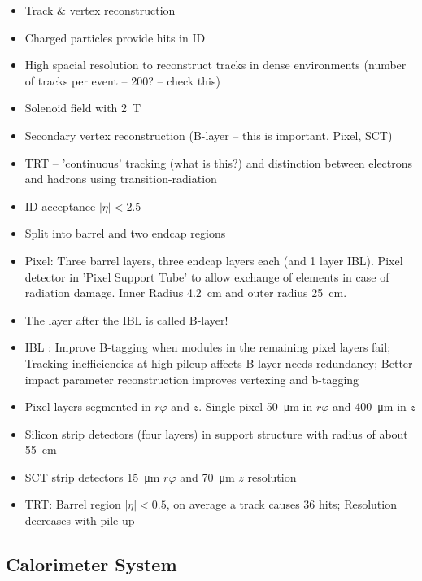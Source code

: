 \begin{itemize}
\item Track \& vertex reconstruction
\item Charged particles provide hits in ID
\item High spacial resolution to reconstruct tracks in dense environments
  (number of tracks per event -- 200? -- check this)
\item Solenoid field with \SI{2}{\tesla}
\item Secondary vertex reconstruction (B-layer -- this is important, Pixel, SCT)
\item TRT -- 'continuous' tracking (what is this?) and distinction between
  electrons and hadrons using transition-radiation
\item ID acceptance $|\eta| < \num{2.5}$
\item Split into barrel and two endcap regions
\item Pixel: Three barrel layers, three endcap layers each (and 1 layer IBL).
  Pixel detector in 'Pixel Support Tube' to allow exchange of elements in case
  of radiation damage. Inner Radius \SI{4.2}{\centi\metre} and outer radius
  \SI{25}{\centi\metre}.
\item The layer after the IBL is called B-layer!
\item IBL \cite{ibl_tdr}: Improve B-tagging when modules in the remaining pixel layers fail;
  Tracking inefficiencies at high pileup affects B-layer needs redundancy;
  Better impact parameter reconstruction improves vertexing and b-tagging
\item Pixel layers segmented in $r\varphi$ and $z$. Single pixel
  \SI{50}{\micro\metre} in $r\varphi$ and \SI{400}{\micro\metre} in $z$
\item Silicon strip detectors (four layers) in support structure with radius of
  about \SI{55}{\centi\metre}
\item SCT strip detectors \SI{15}{\micro\metre} $r\varphi$ and
  \SI{70}{\micro\metre} $z$ resolution
\item TRT: Barrel region $|\eta| < \num{0.5}$, on average a track causes 36
  hits; Resolution decreases with pile-up
\end{itemize}

\subsection{Calorimeter System}
\label{sec:atlas_calo}

